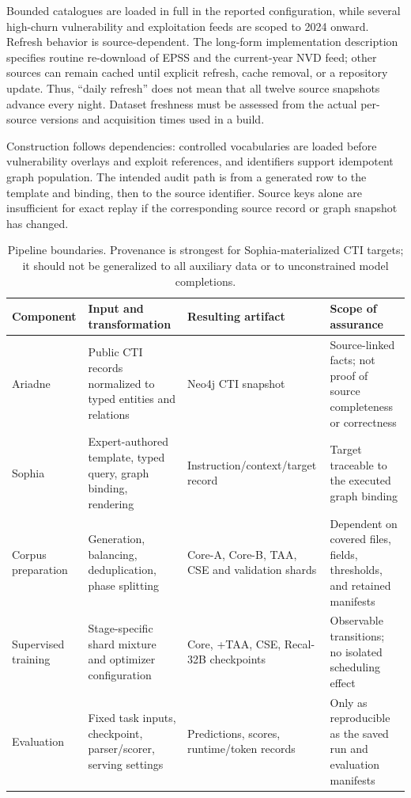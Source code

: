 \documentclass[journal]{IEEEtran}
\begin{document}
Bounded catalogues are loaded in full in the reported configuration, while several high-churn vulnerability and exploitation feeds are scoped to 2024 onward. Refresh behavior is source-dependent. The long-form implementation description specifies routine re-download of EPSS and the current-year NVD feed; other sources can remain cached until explicit refresh, cache removal, or a repository update. Thus, ``daily refresh'' does not mean that all twelve source snapshots advance every night. Dataset freshness must be assessed from the actual per-source versions and acquisition times used in a build.

Construction follows dependencies: controlled vocabularies are loaded before vulnerability overlays and exploit references, and identifiers support idempotent graph population. The intended audit path is from a generated row to the template and binding, then to the source identifier. Source keys alone are insufficient for exact replay if the corresponding source record or graph snapshot has changed.

\begin{table}[!t]
\centering\small
\caption{Pipeline boundaries. Provenance is strongest for Sophia-materialized CTI targets; it should not be generalized to all auxiliary data or to unconstrained model completions.}\label{tab:boundaries}
\begin{tabularx}{\textwidth}{p{}YYY}
\toprule Component & Input and transformation & Resulting artifact & Scope of assurance \\\midrule
Ariadne & Public CTI records normalized to typed entities and relations & Neo4j CTI snapshot & Source-linked facts; not proof of source completeness or correctness \\
Sophia & Expert-authored template, typed query, graph binding, rendering & Instruction/context/target record & Target traceable to the executed graph binding \\
Corpus preparation & Generation, balancing, deduplication, phase splitting & Core-A, Core-B, TAA, CSE and validation shards & Dependent on covered files, fields, thresholds, and retained manifests \\
Supervised training & Stage-specific shard mixture and optimizer configuration & Core, +TAA, CSE, Recal-32B checkpoints & Observable transitions; no isolated scheduling effect \\
Evaluation & Fixed task inputs, checkpoint, parser/scorer, serving settings & Predictions, scores, runtime/token records & Only as reproducible as the saved run and evaluation manifests \\\bottomrule
\end{tabularx}
\end{table}
\end{document}
